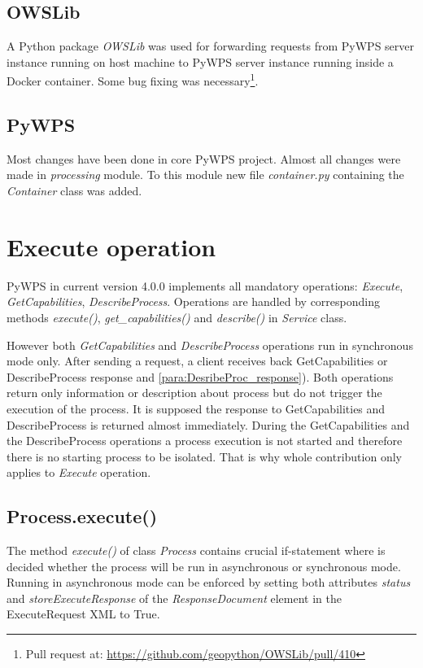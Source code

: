 \documentclass{gifce}
\begin{document}
\subsection{OWSLib}
\label{sub:owslib}
A Python package \textit{OWSLib} was used for forwarding requests from
PyWPS server instance running on host machine to PyWPS server instance
running inside a Docker container. Some bug fixing was necessary\footnote{Pull request at: \url{https://github.com/geopython/OWSLib/pull/410}}.

\subsection{PyWPS}
Most changes have been done in core PyWPS project. Almost all changes were made in \textit{processing} module. To this module new file \textit{container.py} containing the \textit{Container} class was added.

\section{Execute operation}
\label{sec:operations_ov}
PyWPS in current version 4.0.0 implements all mandatory operations: \textit{Execute}, \textit{GetCapabilities}, \textit{DescribeProcess}.
Operations are handled by corresponding methods \textit{execute()}, \textit{get\_capabilities()} and \textit{describe()} in \textit{Service} class. 

However both \textit{GetCapabilities} and \textit{DescribeProcess}
operations run in synchronous mode only. After sending a request, a
client receives back GetCapabilities or DescribeProcess response and
\ref{para:DesribeProc_response}). Both operations return only
information or description about process but do not trigger the
execution of the process. It is supposed the response to
GetCapabilities and DescribeProcess is returned almost immediately.
During the GetCapabilities and the DescribeProcess operations a
process execution is not started and therefore there is no starting
process to be isolated. That is why whole contribution
only applies to \textit{Execute} operation.

\subsection{Process.execute()}
The method \textit{execute()} of class \textit{Process} contains crucial if-statement where is decided whether the process will be
run in asynchronous or synchronous mode. Running in asynchronous mode can be enforced by setting both attributes \textit{status} and \textit{storeExecuteResponse} of the \textit{ResponseDocument} element in the ExecuteRequest XML to True.
\end{document}
